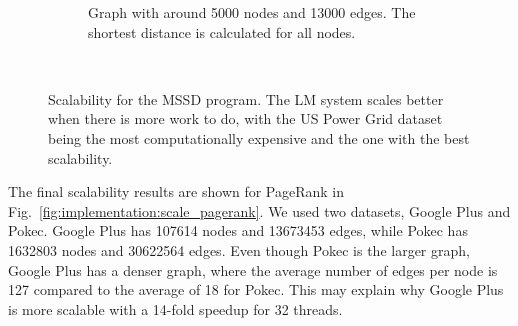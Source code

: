 \begin{figure}[]
\begin{subfigure}[b]{\plotsize\textwidth}
                \label{fig:implementation:scale_sssp_uspowergrid}
                \caption{Graph with around 5000 nodes and 13000 edges. The
                shortest distance is calculated for all nodes.}
        \end{subfigure}\\
        \caption{Scalability for the MSSD program. The LM system scales better
        when there is more work to do, with the US Power Grid dataset being the
        most computationally expensive and the one with the best scalability.}
        \label{fig:implementation:scale_sssp}
\end{figure}

The final scalability results are shown for PageRank in
Fig.~\ref{fig:implementation:scale_pagerank}. We used two datasets, Google Plus
and Pokec. Google Plus has 107614 nodes and 13673453 edges, while Pokec has
1632803 nodes and 30622564 edges. Even though Pokec is the larger graph, Google
Plus has a denser graph, where the average number of edges per node is 127
compared to the average of 18 for Pokec. This may explain why Google Plus is
more scalable with a 14-fold speedup for 32 threads.

